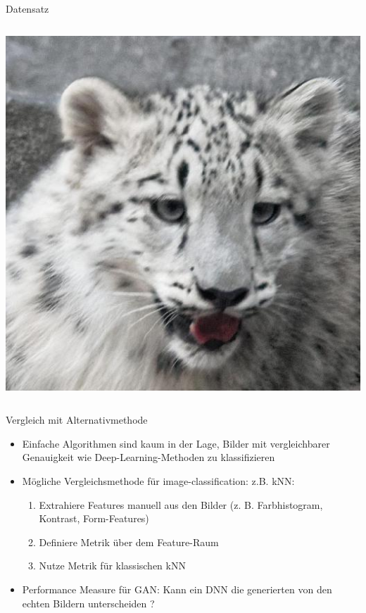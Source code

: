 \documentclass[aspectratio=1610, 9pt]{beamer}
\begin{document}
\begin{frame}{Datensatz}
\begin{columns}
    \includegraphics[scale=0.13]{images/wildlife.jpg}\\

  \end{columns}
\end{frame}

\begin{frame}{Vergleich mit Alternativmethode}
  \begin{itemize}
  \item Einfache Algorithmen sind kaum in der Lage, Bilder mit vergleichbarer Genauigkeit wie Deep-Learning-Methoden zu klassifizieren
  \item Mögliche Vergleichsmethode für image-classification: z.B. kNN:
  \begin{enumerate}
    \item Extrahiere Features manuell aus den Bilder (z. B. Farbhistogram, Kontrast, Form-Features)
    \item Definiere Metrik über dem Feature-Raum
    \item Nutze Metrik für klassischen kNN
  \end{enumerate}
  \item Performance Measure für GAN: Kann ein DNN die generierten von den echten Bildern unterscheiden ?
  \end{itemize}

\end{frame}
\end{document}
